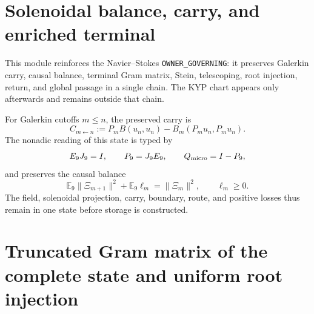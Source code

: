 \section*{Solenoidal balance, carry, and enriched terminal}

This module reinforces the Navier--Stokes \texttt{OWNER\_GOVERNING}: it preserves Galerkin carry, causal balance, terminal Gram matrix, Stein, telescoping, root injection, return, and global passage in a single chain. The KYP chart appears only afterwards and remains outside that chain.

For Galerkin cutoffs \(m\leq n\), the preserved carry is
\begin{equation}\label{eq:amp-ns-owner-acarreo-galerkin}
 C_{m\leftarrow n}
 :=P_mB(u_n,u_n)-B_m(P_m u_n,P_m u_n).
\end{equation}
The nonadic reading of this state is typed by
\begin{equation}\label{eq:amp-ns-owner-e9j9}
 E_9J_9=I,\qquad P_9=J_9E_9,\qquad Q_{\rm micro}=I-P_9,
\end{equation}
and preserves the causal balance
\begin{equation}\label{eq:amp-ns-owner-balance-causal}
 \boxed{
 \mathbb E_9\|\Xi_{m+1}\|^2+\mathbb E_9\ell_m
 =\|\Xi_m\|^2,\qquad \ell_m\geq0.}
\end{equation}
The field, solenoidal projection, carry, boundary, route, and positive losses thus remain in one state before storage is constructed.

\section*{Truncated Gram matrix of the complete state and uniform root injection}

